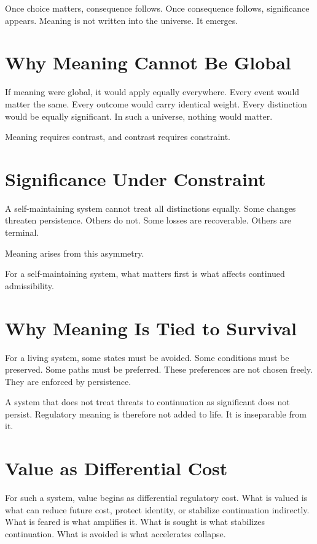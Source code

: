 \documentclass[11pt,twoside,openright]{book}
\begin{document}
Once choice matters, consequence follows. Once consequence follows, significance appears. Meaning is not written into the universe. It emerges.

\section*{Why Meaning Cannot Be Global}

If meaning were global, it would apply equally everywhere. Every event would matter the same. Every outcome would carry identical weight. Every distinction would be equally significant. In such a universe, nothing would matter.

Meaning requires contrast, and contrast requires constraint.

\section*{Significance Under Constraint}

A self-maintaining system cannot treat all distinctions equally. Some changes threaten persistence. Others do not. Some losses are recoverable. Others are terminal.

Meaning arises from this asymmetry.

For a self-maintaining system, what matters first is what affects continued admissibility.

\section*{Why Meaning Is Tied to Survival}

For a living system, some states must be avoided. Some conditions must be preserved. Some paths must be preferred. These preferences are not chosen freely. They are enforced by persistence.

A system that does not treat threats to continuation as significant does not persist. Regulatory meaning is therefore not added to life. It is inseparable from it.

\section*{Value as Differential Cost}

For such a system, value begins as differential regulatory cost. What is valued is what can reduce future cost, protect identity, or stabilize continuation indirectly. What is feared is what amplifies it. What is sought is what stabilizes continuation. What is avoided is what accelerates collapse.
\end{document}
